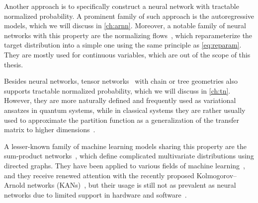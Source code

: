 Another approach is to specifically construct a neural network with tractable normalized probability. A prominent family of such approach is the autoregressive models, which we will discuss in \cref{ch:arnn}. Moreover, a notable family of neural networks with this property are the normalizing flows~\cite{song2017nice, muller2019neural}, which reparameterize the target distribution into a simple one using the same principle as \cref{eq:reparam}. They are mostly used for continuous variables, which are out of the scope of this thesis.

Besides neural networks, tensor networks~\cite{bridgeman2017hand} with chain or tree geometries also supports tractable normalized probability, which we will discuss in \cref{ch:tn}. However, they are more naturally defined and frequently used as variational ansatzes in quantum systems, while in classical systems they are rather usually used to approximate the partition function as a generalization of the transfer matrix to higher dimensions~\cite{verstraete2006criticality, vanderstraeten2018residual, vanhecke2021solving, lanthier2024tensor}.

A lesser-known family of machine learning models sharing this property are the sum-product networks~\cite{poon2011sum}, which define complicated multivariate distributions using directed graphs. They have been applied to various fields of machine learning~\cite{sanchez2021sum}, and they receive renewed attention with the recently proposed Kolmogorov--Arnold networks (KANs)~\cite{liu2024kan}, but their usage is still not as prevalent as neural networks due to limited support in hardware and software~\cite{barham2019machine}.
